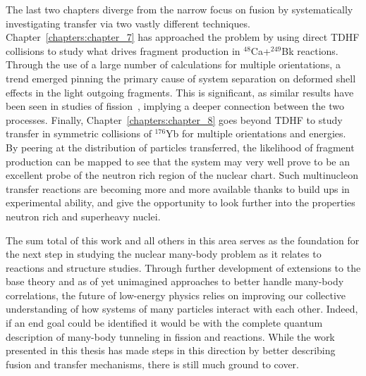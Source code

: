 The last two chapters diverge from the narrow focus on fusion by systematically investigating transfer via two vastly different techniques.
Chapter~\ref{chapters:chapter_7} has approached the problem by using direct TDHF collisions to study what drives fragment production in $^{48}$Ca+$^{249}$Bk reactions.
Through the use of a large number of calculations for multiple orientations, a trend emerged pinning the primary cause of system separation on deformed shell effects in the light outgoing fragments.
This is significant, as similar results have been seen in studies of fission~\citep{scamps2018}, implying a deeper connection between the two processes.
Finally, Chapter~\ref{chapters:chapter_8} goes beyond TDHF to study transfer in symmetric collisions of $^{176}$Yb for multiple orientations and energies.
By peering at the distribution of particles transferred, the likelihood of fragment production can be mapped to see that the system may very well prove to be an excellent probe of the neutron rich region of the nuclear chart.
Such multinucleon transfer reactions are becoming more and more available thanks to build ups in experimental ability, and give the opportunity to look further into the properties neutron rich and superheavy nuclei.

The sum total of this work and all others in this area serves as the foundation for the next step in studying the nuclear many-body problem as it relates to reactions and structure studies.
Through further development of extensions to the base theory and as of yet unimagined approaches to better handle many-body correlations, the future of low-energy physics relies on improving our collective understanding of how systems of many particles interact with each other.
Indeed, if an end goal could be identified it would be with the complete quantum description of many-body tunneling in fission and reactions.
While the work presented in this thesis has made steps in this direction by better describing fusion and transfer mechanisms, there is still much ground to cover.